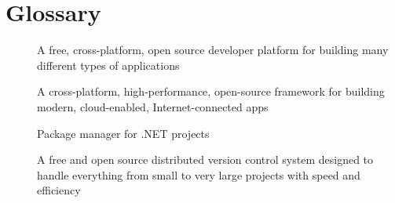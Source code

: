 \chapter*{Glossary}

\begin{description}
    \item [] A free, cross-platform, open source developer platform for building many different types of applications \cite{microsoft_what_2022}
    \item [] A cross-platform, high-performance, open-source framework for building modern, cloud-enabled, Internet-connected apps \cite{rick-anderson_overview_2022}
    \item [] Package manager for .NET projects \cite{microsoft_nuget_2022}
    \item [] A free and open source distributed version control system designed to handle everything from small to very large projects with speed and efficiency \cite{git_git_2022}
\end{description}